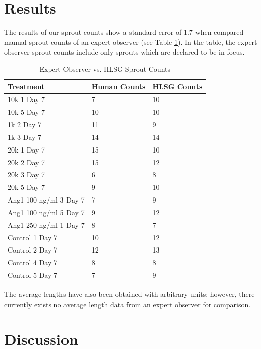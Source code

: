 \documentclass{sig-alternate}
\begin{document}
\section{Results} %
\label{sec:Results}
	The results of our sprout counts show a standard error of $1.7$ when
	compared manual sprout counts of an expert observer (see Table
	\ref{tab:resultcomp}). In the table, the expert observer sprout counts
	include only sprouts which are declared to be in-focus.

	\begin{table}[htp]
		\centering
		\begin{tabular}{| l | l | l |}
			\hline
			\textbf{Treatment} & \textbf{Human Counts} & \textbf{HLSG Counts} \\\hline
			10k 1 Day 7 & 7  & 10 \\\hline
			10k 5 Day 7 & 10 &  10 \\\hline
			1k 2 Day 7 & 11 & 9 \\\hline
			1k 3 Day 7 & 14 & 14 \\\hline
			20k 1 Day 7 & 15 & 10 \\\hline
			20k 2 Day 7 & 15 & 12 \\\hline
			20k 3 Day 7 & 6 & 8 \\\hline
			20k 5 Day 7 & 9 & 10 \\\hline
			Ang1 100 ng/ml 3 Day 7 & 7 & 9 \\\hline
			Ang1 100 ng/ml 5 Day 7 & 9 & 12 \\\hline
			Ang1 250 ng/ml 1 Day 7 & 8 & 7\\\hline
			Control 1 Day 7 & 10 & 12 \\\hline
			Control 2 Day 7 & 12 & 13 \\\hline
			Control 4 Day 7 & 8 & 8 \\\hline
			Control 5 Day 7 & 7 & 9 \\\hline
		\end{tabular}
		\caption{Expert Observer vs. HLSG Sprout Counts}
		\label{tab:resultcomp}
	\end{table}

	The average lengths have also been obtained with arbitrary units;
	however, there currently exists no average length data from an expert
	observer for comparison.

\section{Discussion} %
\label{sec:Discussion}
\end{document}
